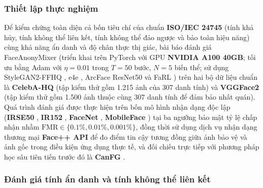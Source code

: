\documentclass[oneside,a4paper,12pt]{extarticle}
\begin{document}
\subsubsection*{Thiết lập thực nghiệm}
Để kiểm chứng toàn diện cả bốn tiêu chí của chuẩn \textbf{ISO/IEC 24745} \cite{iso24745} (tính khả hủy, tính không thể liên kết, tính không thể đảo ngược và bảo toàn hiệu năng) cùng khả năng ẩn danh và độ chân thực thị giác, bài báo đánh giá FaceAnonyMixer \cite{alam2025} (triển khai trên PyTorch với GPU \textbf{NVIDIA A100 40GB}; tối ưu bằng Adam \cite{kingma2014adam} với $\eta = 0.01$ trong $T = 50$ bước, $N = 5$ biến thể; sử dụng StyleGAN2-FFHQ \cite{karras2020stylegan2}, e4e \cite{tov2021e4e}, ArcFace \cite{deng2019arcface} ResNet50 \cite{he2016resnet} và FaRL \cite{zheng2022farl}) trên hai bộ dữ liệu chuẩn là \textbf{CelebA-HQ} \cite{karras2017celebahq} (tập kiểm thử gồm 1.215 ảnh của 307 danh tính) và \textbf{VGGFace2} \cite{cao2018vggface2} (tập kiểm thử gồm 1.500 ảnh thuộc cùng 307 danh tính để đảm bảo nhất quán). Quá trình đánh giá được thực hiện trên bốn mô hình nhận dạng độc lập (\textbf{IRSE50} \cite{hu2018senet}, \textbf{IR152} \cite{deng2019arcface}, \textbf{FaceNet} \cite{schroff2015facenet}, \textbf{MobileFace} \cite{chen2018mobileface}) tại ba ngưỡng bảo mật tỷ lệ chấp nhận nhầm $\text{FMR} \in \{0.1\%, 0.01\%, 0.001\%\}$, đồng thời sử dụng dịch vụ nhận dạng thương mại \textbf{Face++ API} \cite{facepp2024} để đo điểm tin cậy tương đồng giữa ảnh bảo vệ và ảnh gốc trong điều kiện ứng dụng thực tế, và đối chiếu trực tiếp với phương pháp học sâu tiên tiến trước đó là \textbf{CanFG} \cite{wang2024canfg}.

\subsubsection*{Đánh giá tính ẩn danh và tính không thể liên kết}
\end{document}
